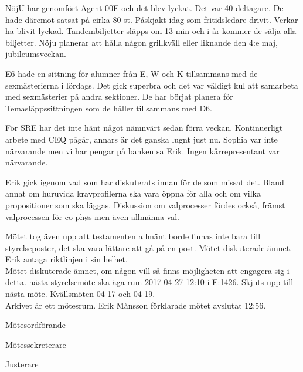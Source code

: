 \documentclass[10pt]{article}
\def\mo{Erik Månsson}
\def\ms{Johan Karlberg}
\def\ji{Josefine Sandström}
\begin{document}
\begin{paragrafer}
\begin{paragrafer}
NöjU har genomfört Agent 00E och det blev lyckat. Det var 40 deltagare. De hade däremot satsat på cirka 80 st. Påskjakt idag som fritidsledare drivit. Verkar ha blivit lyckad. Tandembiljetter släpps om 13 min och i år kommer de sälja alla biljetter. Nöju planerar att hålla någon grillkväll eller liknande den 4:e maj, jubileumsveckan.

E6 hade en sittning för alumner från E, W och K tillsammans med de sexmästerierna i lördags. Det gick superbra och det var väldigt kul att samarbeta med sexmästerier på andra sektioner. De har börjat planera för Temasläppssittningen som de håller tillsammans med D6.

För SRE har det inte hänt något nämnvärt sedan förra veckan. Kontinuerligt arbete med CEQ pågår, annars är det ganska lugnt just nu.
Sophia var inte närvarande men vi har pengar på banken sa Erik.
Ingen kårrepresentant var närvarande.
\end{paragrafer}

Erik gick igenom vad som har diskuterats innan för de som missat det. Bland annat om huruvida kravprofilerna ska vara öppna för alla och om vilka propositioner som ska läggas. Diskussion om valprocesser fördes också, främst valprocessen för co-phøs men även allmänna val.

Mötet tog även upp att testamenten allmänt borde finnas inte bara till styrelseposter, det ska vara lättare att gå på en post.
Mötet diskuterade ämnet.
Erik \ypa antaga riktlinjen i sin helhet.\\
\Mbaby
{}
Mötet diskuterade ämnet, om någon vill så finns möjligheten att engagera sig i detta.
{\Mba} nästa styrelsemöte ska äga rum 2017-04-27 12:10 i E:1426.
Skjuts upp till nästa möte.
Kvällsmöten 04-17 och 04-19.\\
Arkivet är ett mötesrum.
{\mo} förklarade mötet avslutat 12:56.

\end{paragrafer}

\hidesignfoot
\begin{signatures}{3}
\signature{\mo}{Mötesordförande}
\signature{\ms}{Mötessekreterare}
\signature{\ji}{Justerare}
\end{signatures}
\end{document}
